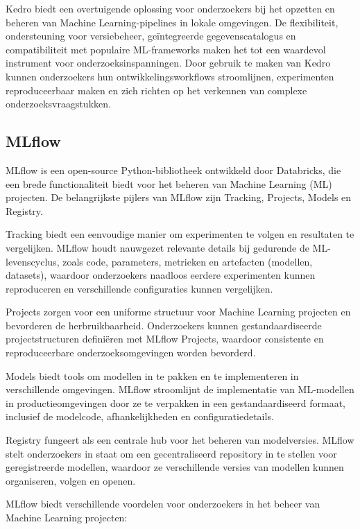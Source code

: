 Kedro biedt een overtuigende oplossing voor onderzoekers bij het opzetten en beheren van Machine Learning-pipelines in lokale omgevingen. De flexibiliteit, ondersteuning voor versiebeheer, geïntegreerde gegevenscatalogus en compatibiliteit met populaire ML-frameworks maken het tot een waardevol instrument voor onderzoeksinspanningen. Door gebruik te maken van Kedro kunnen onderzoekers hun ontwikkelingsworkflows stroomlijnen, experimenten reproduceerbaar maken en zich richten op het verkennen van complexe onderzoeksvraagstukken.
\subsection{MLflow}

\textcite{MLflow2023} MLflow is een open-source Python-bibliotheek ontwikkeld door Databricks, die een brede functionaliteit biedt voor het beheren van Machine Learning (ML) projecten. De belangrijkste pijlers van MLflow zijn Tracking, Projects, Models en Registry.

Tracking biedt een eenvoudige manier om experimenten te volgen en resultaten te vergelijken. MLflow houdt nauwgezet relevante details bij gedurende de ML-levenscyclus, zoals code, parameters, metrieken en artefacten (modellen, datasets), waardoor onderzoekers naadloos eerdere experimenten kunnen reproduceren en verschillende configuraties kunnen vergelijken.

Projects zorgen voor een uniforme structuur voor Machine Learning projecten en bevorderen de herbruikbaarheid. Onderzoekers kunnen gestandaardiseerde projectstructuren definiëren met MLflow Projects, waardoor consistente en reproduceerbare onderzoeksomgevingen worden bevorderd.

Models biedt tools om modellen in te pakken en te implementeren in verschillende omgevingen. MLflow stroomlijnt de implementatie van ML-modellen in productieomgevingen door ze te verpakken in een gestandaardiseerd formaat, inclusief de modelcode, afhankelijkheden en configuratiedetails.

Registry fungeert als een centrale hub voor het beheren van modelversies. MLflow stelt onderzoekers in staat om een gecentraliseerd repository in te stellen voor geregistreerde modellen, waardoor ze verschillende versies van modellen kunnen organiseren, volgen en openen.

MLflow biedt verschillende voordelen voor onderzoekers in het beheer van Machine Learning projecten:

